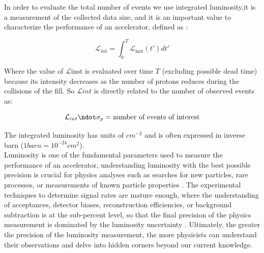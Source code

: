 In order to evaluate the total number of events we use integrated luminosity,it is a measurement of the collected data size, and it is an important value to characterize the performance of an accelerator, defined as \cite{concept_of_luminosity}:

\begin{equation}
  \mathcal{L}_{int}=\int_{0}^{T} \mathcal {L}_{\text{inst}}(t') dt'
\end{equation}

Where the value of $\mathcal{L}{\text{inst}}$ is evaluated over time $T$ (excluding possible dead time) because its intensity decreases as the number of protons reduces during the collisions of the fill. So $\mathcal{L}{int}$ is directly related to the number of observed events as:

\begin{equation}
  \mathcal{L}_{int} \ndot \sigma_{p}= \text{number of events of interest}
\end{equation}

The integrated luminosity has units of $cm^{-2}$ and is often expressed in inverse barn ($1 barn= 10^{-24}cm^{2}$). \\

Luminosity is one of the fundamental parameters used to measure the performance of an accelerator, understanding luminosity with the best possible precision is crucial for physics analyses such as searches for new particles, rare processes, or measurements of known particle properties \cite{lumi_motiv}.
The experimental techniques to determine signal rates are mature enough, where the understanding of acceptances, detector biases, reconstruction efficiencies, or background subtraction is at the sub-percent level, so that the final precision of the physics measurement is dominated by the luminosity uncertainty \cite{lumi_paper_def_and_concept}. Ultimately, the greater the precision of the luminosity measurement, the more physicists can understand their observations and delve into hidden corners beyond our current knowledge.

